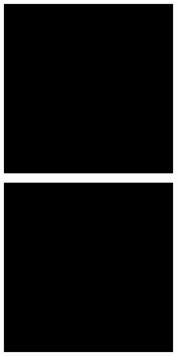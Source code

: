\documentclass[11pt,twoside,a4paper]{article}
\begin{document}
\begin{figure}[!b]
    \centering
    \begin{subfigure}{0.35\textwidth}
	\includegraphics[width=\linewidth]{black.png}
        \caption{}
    \end{subfigure}
    \begin{subfigure}{0.35\textwidth}
	\includegraphics[width=\linewidth]{black.png}
        \caption{}
    \end{subfigure}
    \caption{}
    \label{fig:n_preds}
\end{figure}
\end{document}
